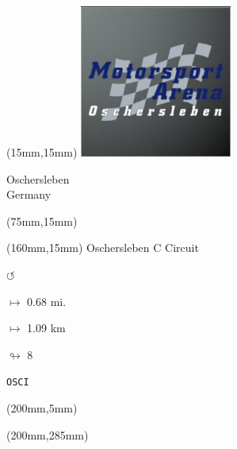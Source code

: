 \begin{textblock*}{50mm}(15mm,15mm)%
\includegraphics[width=50mm]{LG/2015-05-20_00090.png}
\par Oschersleben\\ Germany
\end{textblock*}
\begin{textblock*}{80mm}(75mm,15mm)%
\end{textblock*}
\begin{textblock*}{40mm}(160mm,15mm)%
Oschersleben C Circuit
\par \Huge$\circlearrowleft$
\Large
\par$\mapsto$ 0.68 mi.
\par$\mapsto$ 1.09 km
\par$\looparrowright$ 8
\par\hfill\tiny\tt OSCI\\
\end{textblock*}
\begin{textblock*}{20mm}(200mm,5mm)%
\fbox{\thepage}
\end{textblock*}
\begin{textblock*}{20mm}(200mm,285mm)%
\fbox{\thepage}
\end{textblock*}
\null\newpage

